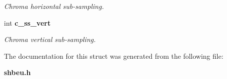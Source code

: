 \begin{DoxyCompactItemize}
\begin{DoxyCompactList}\small\item\em Chroma horizontal sub-\/sampling. \item\end{DoxyCompactList}\item 
int {\bf c\_\-ss\_\-vert}\label{structformat__info_a307174605617c7d70af459f1d1df8db8}

\begin{DoxyCompactList}\small\item\em Chroma vertical sub-\/sampling. \item\end{DoxyCompactList}\end{DoxyCompactItemize}


The documentation for this struct was generated from the following file:\begin{DoxyCompactItemize}
\item 
{\bf shbeu.h}\end{DoxyCompactItemize}
